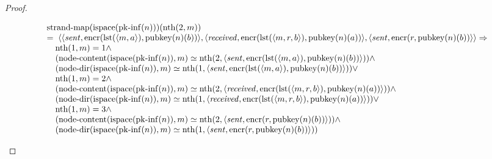 \documentclass[11pt]{article}
\theoremstyle{plain}
\begin{document}
\begin{proof}
\begin{itemize}[leftmargin=2.8em, itemsep=4pt, parsep=1pt]
\begin{itemize}[leftmargin=2.8em, itemsep=4pt, parsep=1pt]
\begin{equation*}
\begin{array}{@{}l@{}}
\begin{array}{@{}l@{}} \operatorname{strand\text{-}map}(\operatorname{ispace}(\operatorname{pk\text{-}inf}(n)))(\operatorname{nth}(2, m)) \\ =\; \langle \langle \mathit{sent}, \operatorname{encr}(\operatorname{lst}(\langle m, a \rangle), \operatorname{pubkey}(n)(b)) \rangle, \langle \mathit{received}, \operatorname{encr}(\operatorname{lst}(\langle m, r, b \rangle), \operatorname{pubkey}(n)(a)) \rangle, \langle \mathit{sent}, \operatorname{encr}(r, \operatorname{pubkey}(n)(b)) \rangle \rangle \Rightarrow \\ \quad \operatorname{nth}(1, m) = 1 \wedge \\ \quad (\operatorname{node\text{-}content}(\operatorname{ispace}(\operatorname{pk\text{-}inf}(n)), m) \simeq \operatorname{nth}(2, \langle \mathit{sent}, \operatorname{encr}(\operatorname{lst}(\langle m, a \rangle), \operatorname{pubkey}(n)(b)) \rangle)) \wedge \\ \quad (\operatorname{node\text{-}dir}(\operatorname{ispace}(\operatorname{pk\text{-}inf}(n)), m) \simeq \operatorname{nth}(1, \langle \mathit{sent}, \operatorname{encr}(\operatorname{lst}(\langle m, a \rangle), \operatorname{pubkey}(n)(b)) \rangle)) \vee \\ \quad \operatorname{nth}(1, m) = 2 \wedge \\ \quad (\operatorname{node\text{-}content}(\operatorname{ispace}(\operatorname{pk\text{-}inf}(n)), m) \simeq \operatorname{nth}(2, \langle \mathit{received}, \operatorname{encr}(\operatorname{lst}(\langle m, r, b \rangle), \operatorname{pubkey}(n)(a)) \rangle)) \wedge \\ \quad (\operatorname{node\text{-}dir}(\operatorname{ispace}(\operatorname{pk\text{-}inf}(n)), m) \simeq \operatorname{nth}(1, \langle \mathit{received}, \operatorname{encr}(\operatorname{lst}(\langle m, r, b \rangle), \operatorname{pubkey}(n)(a)) \rangle)) \vee \\ \quad \operatorname{nth}(1, m) = 3 \wedge \\ \quad (\operatorname{node\text{-}content}(\operatorname{ispace}(\operatorname{pk\text{-}inf}(n)), m) \simeq \operatorname{nth}(2, \langle \mathit{sent}, \operatorname{encr}(r, \operatorname{pubkey}(n)(b)) \rangle)) \wedge \\ \quad (\operatorname{node\text{-}dir}(\operatorname{ispace}(\operatorname{pk\text{-}inf}(n)), m) \simeq \operatorname{nth}(1, \langle \mathit{sent}, \operatorname{encr}(r, \operatorname{pubkey}(n)(b)) \rangle)) \end{array} \\

\end{array}
\end{equation*}
\end{itemize}
\end{itemize}
\end{proof}
\end{document}
